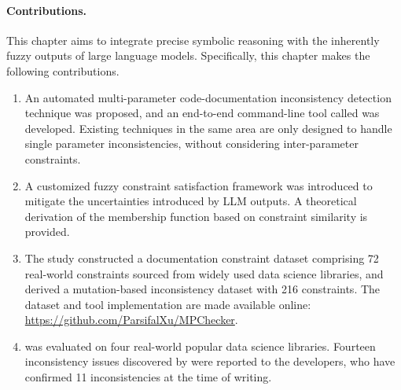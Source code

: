 \paragraph{Contributions.}
This chapter aims to integrate precise symbolic reasoning with the inherently fuzzy outputs of large language models.
Specifically, this chapter makes the following contributions.
\begin{enumerate}
    \emergencystretch=2em
    \item An automated multi-parameter code-documentation inconsistency detection technique was proposed, and an end-to-end command-line tool called \toolchecker was developed. Existing techniques in the same area are only designed to handle single parameter inconsistencies, without considering inter-parameter constraints.
    \item A customized fuzzy constraint satisfaction framework was introduced to mitigate the
    uncertainties introduced by LLM outputs. A theoretical derivation of the membership function based on constraint similarity is provided.
    \item The study constructed a documentation constraint dataset comprising 72 real-world constraints sourced from widely used data science libraries, and derived a mutation-based inconsistency dataset with 216 constraints.
    The dataset and tool implementation are made available online: \url{https://github.com/ParsifalXu/MPChecker}.
    \item \toolchecker was evaluated on four real-world popular data science libraries. Fourteen inconsistency issues discovered by \toolchecker were reported to the developers, who have confirmed 11 inconsistencies at the time of writing.
\end{enumerate}
